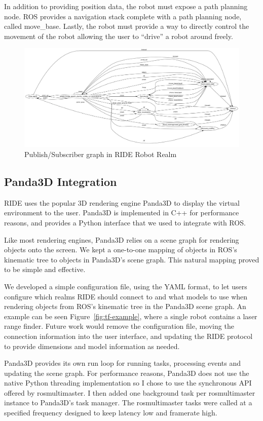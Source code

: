 In addition to providing position data, the robot must expose a path planning node. ROS provides a navigation stack complete with a path planning node, called move\_base. Lastly, the robot must provide a way to directly control the movement of the robot allowing the user to ``drive'' a robot around freely.

\begin{figure}
\includegraphics[width=\textwidth]{images/ride-robot-realm.png}
\caption{Publish/Subscriber graph in RIDE Robot Realm\label{fig:ride-robot-realm}}
\end{figure}


\subsection{Panda3D Integration}

RIDE uses the popular 3D rendering engine Panda3D to display the virtual environment to the user. Panda3D is implemented in C++ for performance reasons, and provides a Python interface that we used to integrate with ROS. 

Like most rendering engines, Panda3D relies on a scene graph for rendering objects onto the screen. We kept a one-to-one mapping of objects in ROS's kinematic tree to objects in Panda3D's scene graph. This natural mapping proved to be simple and effective.

We developed a simple configuration file, using the YAML format, to let users configure which realms RIDE should connect to and what models to use when rendering objects from ROS's kinematic tree in the Panda3D scene graph. An example can be seen Figure~\ref{fig:tf-example}, where a single robot contains a laser range finder. Future work would remove the configuration file, moving the connection information into the user interface, and updating the RIDE protocol to provide dimensions and model information as needed.


Panda3D provides its own run loop for running tasks, processing events and updating the scene graph. For performance reasons, Panda3D does not use the native Python threading implementation so I chose to use the synchronous API offered by rosmultimaster. I then added one background task per rosmultimaster instance to Panda3D's task manager. The rosmultimaster tasks were called at a specified frequency designed to keep latency low and framerate high.
